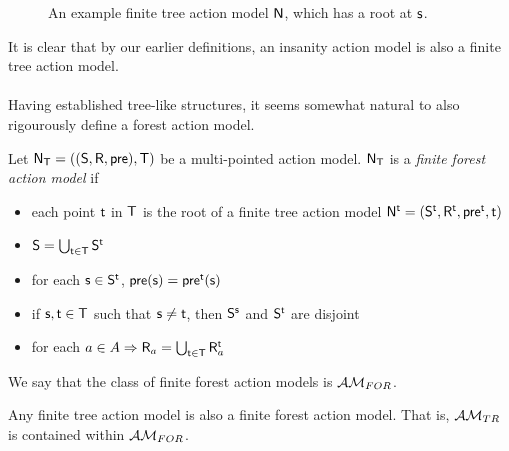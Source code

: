 \begin{figure}
\centering
{}
\caption[Example tree]{An example finite tree action model $\evM$, which has a root at $\evs$.}
\label{figure:exampleTree}
\end{figure}

It is clear that by our earlier definitions, an insanity action model is also a
finite tree action
model.\\
\\
Having established tree-like structures, it seems somewhat natural to also rigourously define a
forest action model.

\begin{defn} \label{forest}
Let $\evM_\evT = ((\evS, \evR, \evpr), \evT)$ be a multi-pointed action model.
$\evM_\evT$ is a {\em finite forest action model} if
\begin{itemize}
	\item each point $\evt$ in $\evT$ is the root of a finite tree action model $\evM^\evt =
	(\evS^\evt, \evR^\evt,
	\evpr^\evt, \evt)$
  \item $\evS = \bigcup_{\evt \in \evT} \evS^\evt$
	\item for each $\evs \in \evS^\evt$, $\evpr(\evs) = \evpr^\evt(\evs)$
	\item if $\evs, \evt \in \evT$ such that $\evs \neq \evt$, then $\evS^\evs$ and $\evS^\evt$ are disjoint
  \item for each $a \in A \Rightarrow \evR_a = \bigcup_{\evt \in \evT} \evR_a^\evt$
\end{itemize}
\end{defn}

We say that the class of finite forest action models is $\forestClass$.

\begin{lemma} \label{treeIsForest}
	Any finite tree action model is also a finite forest action model.
	That is, $\treeClass$ is contained within $\forestClass$.
\end{lemma}

